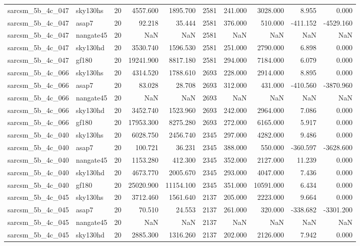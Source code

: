 \begin{tabular}{llrrrrrrrr}
sarcsm\_5b\_4c\_047 & sky130hs & 20 & 4557.600 & 1895.700 & 2581 & 241.000 & 3028.000 & 8.955 & 0.000 \\
sarcsm\_5b\_4c\_047 & asap7 & 20 & 92.218 & 35.444 & 2581 & 376.000 & 510.000 & -411.152 & -4529.160 \\
sarcsm\_5b\_4c\_047 & nangate45 & 20 & NaN & NaN & 2581 & NaN & NaN & NaN & NaN \\
sarcsm\_5b\_4c\_047 & sky130hd & 20 & 3530.740 & 1596.530 & 2581 & 251.000 & 2790.000 & 6.898 & 0.000 \\
sarcsm\_5b\_4c\_047 & gf180 & 20 & 19241.900 & 8817.180 & 2581 & 294.000 & 7184.000 & 6.079 & 0.000 \\
sarcsm\_5b\_4c\_066 & sky130hs & 20 & 4314.520 & 1788.610 & 2693 & 228.000 & 2914.000 & 8.895 & 0.000 \\
sarcsm\_5b\_4c\_066 & asap7 & 20 & 83.028 & 28.708 & 2693 & 312.000 & 431.000 & -410.560 & -3870.960 \\
sarcsm\_5b\_4c\_066 & nangate45 & 20 & NaN & NaN & 2693 & NaN & NaN & NaN & NaN \\
sarcsm\_5b\_4c\_066 & sky130hd & 20 & 3452.740 & 1523.960 & 2693 & 242.000 & 2964.000 & 7.086 & 0.000 \\
sarcsm\_5b\_4c\_066 & gf180 & 20 & 17953.300 & 8275.280 & 2693 & 272.000 & 6165.000 & 5.917 & 0.000 \\
sarcsm\_5b\_4c\_040 & sky130hs & 20 & 6028.750 & 2456.740 & 2345 & 297.000 & 4282.000 & 9.486 & 0.000 \\
sarcsm\_5b\_4c\_040 & asap7 & 20 & 100.721 & 36.231 & 2345 & 388.000 & 550.000 & -360.597 & -3628.600 \\
sarcsm\_5b\_4c\_040 & nangate45 & 20 & 1153.280 & 412.300 & 2345 & 352.000 & 2127.000 & 11.239 & 0.000 \\
sarcsm\_5b\_4c\_040 & sky130hd & 20 & 4673.770 & 2005.670 & 2345 & 293.000 & 4047.000 & 7.436 & 0.000 \\
sarcsm\_5b\_4c\_040 & gf180 & 20 & 25020.900 & 11154.100 & 2345 & 351.000 & 10591.000 & 6.434 & 0.000 \\
sarcsm\_5b\_4c\_045 & sky130hs & 20 & 3712.460 & 1561.640 & 2137 & 205.000 & 2223.000 & 9.664 & 0.000 \\
sarcsm\_5b\_4c\_045 & asap7 & 20 & 70.510 & 24.553 & 2137 & 261.000 & 320.000 & -338.682 & -3301.200 \\
sarcsm\_5b\_4c\_045 & nangate45 & 20 & NaN & NaN & 2137 & NaN & NaN & NaN & NaN \\
sarcsm\_5b\_4c\_045 & sky130hd & 20 & 2885.300 & 1316.260 & 2137 & 202.000 & 2126.000 & 7.942 & 0.000 \\

\end{tabular}
